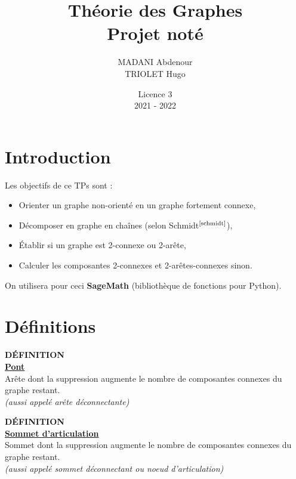 \documentclass{article}      %
\title{Théorie des Graphes\\\Large{Projet noté}}
\author{MADANI Abdenour\\TRIOLET Hugo}
\date{Licence 3\\2021 - 2022}
\begin{document}
\normalsize
\maketitle

\renewcommand*\contentsname{Table des matières}
\tableofcontents
\newpage



\section{Introduction}
Les objectifs de ce TPs sont :
\begin{itemize}
  \item Orienter un graphe non-orienté en un graphe fortement connexe,
  \item Décomposer en graphe en chaînes (selon Schmidt$^\text{\cite{schmidt}}$),
  \item Établir si un graphe est 2-connexe ou 2-arête,
  \item Calculer les composantes 2-connexes et 2-arêtes-connexes sinon.
\end{itemize}

On utilisera pour ceci \textbf{SageMath} (bibliothèque de fonctions pour Python).



\section{Définitions}
\begin{definition}
{ \scriptsize \textcolor{definition}{ \textbf{DÉFINITION}}}
\vspace{3px}
\\ \underline{\textbf{Pont}}
\vspace{2.5px}
\\ Arête dont la suppression augmente le nombre de composantes connexes du graphe restant.%
\\ \textit{(aussi appelé arête déconnectante)}
\end{definition}

\begin{definition}
{ \scriptsize \textcolor{definition}{ \textbf{DÉFINITION}}}
\vspace{3px}
\\ \underline{\textbf{Sommet d'articulation}}
\vspace{2.5px}
\\ Sommet dont la suppression augmente le nombre de composantes connexes du graphe restant.%
\\ \textit{(aussi appelé sommet déconnectant ou noeud d'articulation)}
\end{definition}
\end{document}

